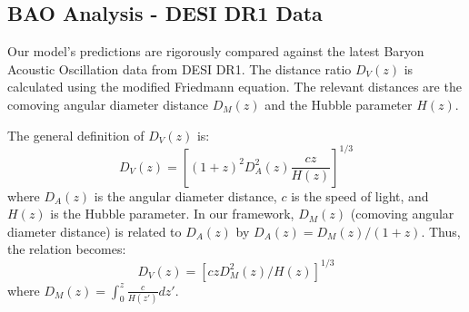 \documentclass{article}
\begin{document}
\subsection{BAO Analysis - DESI DR1 Data}
Our model's predictions are rigorously compared against the latest Baryon Acoustic Oscillation data from DESI DR1. The distance ratio $D_V(z)$ is calculated using the modified Friedmann equation. The relevant distances are the comoving angular diameter distance $D_M(z)$ and the Hubble parameter $H(z)$.

The general definition of $D_V(z)$ is:
$$D_V(z) = \left[ (1+z)^2 D_A^2(z) \frac{c z}{H(z)} \right]^{1/3}$$
where $D_A(z)$ is the angular diameter distance, $c$ is the speed of light, and $H(z)$ is the Hubble parameter. In our framework, $D_M(z)$ (comoving angular diameter distance) is related to $D_A(z)$ by $D_A(z) = D_M(z) / (1+z)$. Thus, the relation becomes:
$$D_V(z) = \left[ c z D_M^2(z) / H(z) \right]^{1/3}$$
where $D_M(z) = \int_0^z \frac{c}{H(z')} dz'$.
\end{document}

